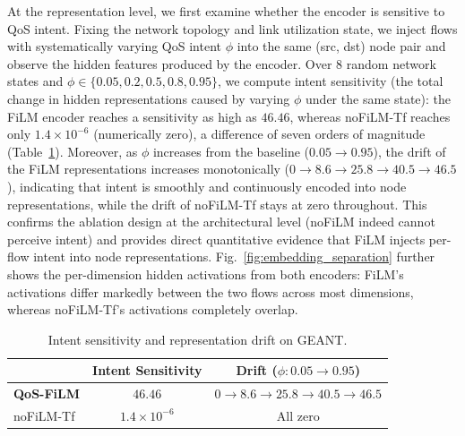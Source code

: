 At the representation level, we first examine whether the encoder is sensitive to QoS intent. Fixing the network topology and link utilization state, we inject flows with systematically varying QoS intent $\phi$ into the same (src, dst) node pair and observe the hidden features produced by the encoder. Over $8$ random network states and $\phi\!\in\!\{0.05,0.2,0.5,0.8,0.95\}$, we compute intent sensitivity (the total change in hidden representations caused by varying $\phi$ under the same state): the FiLM encoder reaches a sensitivity as high as $46.46$, whereas noFiLM-Tf reaches only $1.4\times10^{-6}$ (numerically zero), a difference of seven orders of magnitude (Table~\ref{tab:interp_repr}). Moreover, as $\phi$ increases from the baseline ($0.05\!\to\!0.95$), the drift of the FiLM representations increases monotonically ($0\!\to\!8.6\!\to\!25.8\!\to\!40.5\!\to\!46.5$), indicating that intent is smoothly and continuously encoded into node representations, while the drift of noFiLM-Tf stays at zero throughout. This confirms the ablation design at the architectural level (noFiLM indeed cannot perceive intent) and provides direct quantitative evidence that FiLM injects per-flow intent into node representations. Fig.~\ref{fig:embedding_separation} further shows the per-dimension hidden activations from both encoders: FiLM's activations differ markedly between the two flows across most dimensions, whereas noFiLM-Tf's activations completely overlap.



\begin{table}[t]
\centering
\caption{Intent sensitivity and representation drift on GEANT.}
\label{tab:interp_repr}
\setlength{\tabcolsep}{5pt}
\begin{tabular}{lcc}
\toprule
 & Intent Sensitivity & Drift ($\phi\!:0.05\!\to\!0.95$) \\
\midrule
\textbf{QoS-FiLM}  & $\mathbf{46.46}$ & $0\to8.6\to25.8\to40.5\to46.5$ \\
noFiLM-Tf         & $1.4\times10^{-6}$ & All zero \\
\bottomrule
\end{tabular}
\end{table}



